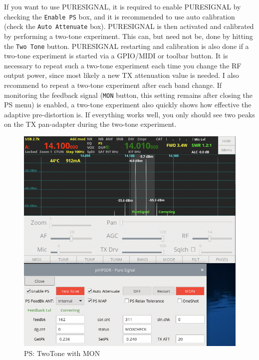 \documentclass[12pt]{book}
\def\rett#1{\texttt{\color{red}#1}}
\begin{document}
If you want to use PURESIGNAL, it is required to enable PURESIGNAL by checking the
\rett{Enable PS} box, and it is recommended to use auto calibration (check the
\rett{Auto Attenuate} box). PURESIGNAL is then activated and calibrated by
performing a two-tone experiment. This can, but need not be, done by hitting
the \rett{Two Tone} button. PURESIGNAL restarting and calibration is also done
if a two-tone experiment is started via a GPIO/MIDI or toolbar button.
It is necessary to repeat such a two-tone experiment each time you change the
RF output power, since most likely a new TX attenuation value is needed. I also
recommend to repeat a two-tone experiment after each band change. If monitoring
the feedback signal (\rett{MON} button, this setting remains after closing the
PS menu) is enabled, a two-tone experiment also quickly shows how effective
the adaptive pre-distortion is. If everything works well, you only should see
two peaks on the TX pan-adapter during the two-tone experiment.

\begin{figure}[t!]
\center
\includegraphics[scale=0.45]{PSmon.png}
\caption{PS: TwoTone with MON}
\label{fig:PSmon}
\end{figure}
\end{document}
